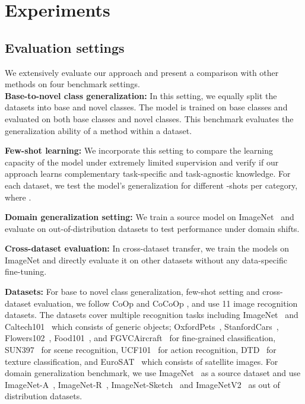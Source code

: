 \documentclass[10pt,twocolumn,letterpaper]{article}
\begin{document}
\section{Experiments}
\subsection{Evaluation settings}
We extensively evaluate our approach and present a comparison with other methods on four benchmark settings. \\
\textbf{Base-to-novel class generalization:} In this setting, we equally split the datasets into base and novel classes. The model is trained on base classes and evaluated on both base classes and novel classes. This benchmark evaluates the generalization ability of a method within a dataset. 

\noindent \textbf{Few-shot learning:} We incorporate this setting to compare the learning capacity of the model under extremely limited supervision and verify if our approach learns {complementary} task-specific and task-agnostic knowledge. For each dataset, we test the model's generalization for different -shots per category, where .  

\noindent \textbf{Domain generalization setting:} We train a source model on ImageNet~\cite{deng2009imagenet} and evaluate on out-of-distribution datasets to test performance under domain shifts. 

\noindent \textbf{Cross-dataset evaluation:} In cross-dataset transfer, we train the models on ImageNet \cite{deng2009imagenet} and directly evaluate it on other datasets without any data-specific fine-tuning. 

\noindent \textbf{Datasets:} For base to novel class generalization, few-shot setting and cross-dataset evaluation, we follow CoOp \cite{zhou2022learning} and CoCoOp \cite{zhou2022conditional}, and use 11 image recognition datasets. The datasets cover multiple recognition tasks including ImageNet~\cite{deng2009imagenet} and Caltech101~\cite{fei2004learning} which consists of generic objects; OxfordPets~\cite{parkhi2012cats}, StanfordCars~\cite{krause20133d}, Flowers102~\cite{nilsback2008automated}, Food101~\cite{bossard2014food}, and FGVCAircraft~\cite{maji2013fine} for fine-grained classification, SUN397~\cite{xiao2010sun} for scene recognition, UCF101~\cite{soomro2012ucf101} for action recognition, DTD~\cite{cimpoi2014describing} for texture classification, and EuroSAT~\cite{helber2019eurosat} which consists of satellite images. For domain generalization benchmark, we use ImageNet~\cite{deng2009imagenet} as a source dataset and use ImageNet-A~\cite{hendrycks2021natural}, ImageNet-R~\cite{hendrycks2021many}, ImageNet-Sketch~\cite{wang2019learning} and ImageNetV2~\cite{recht2019imagenet} as out of distribution datasets.
\end{document}
